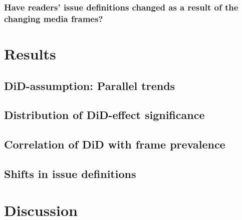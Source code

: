 \documentclass{article}
\begin{document}
\subsubsection{Have readers' issue definitions changed as a result of the changing media frames?}


\section{Results}

\subsection{DiD-assumption: Parallel trends}



\subsection{Distribution of DiD-effect significance}


\subsection{Correlation of DiD with frame prevalence}


\subsection{Shifts in issue definitions}


\section{Discussion}
\end{document}
